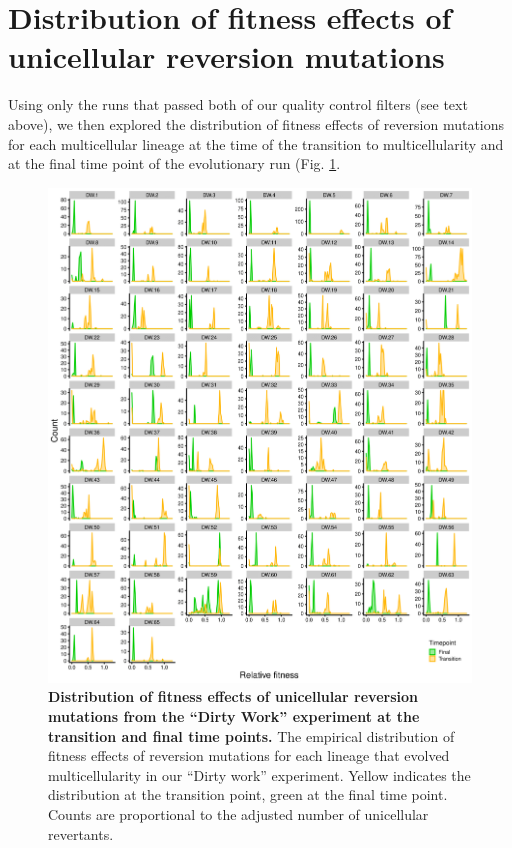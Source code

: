 \documentclass[
]{book}
\begin{document}
\hypertarget{distribution-of-fitness-effects-of-unicellular-reversion-mutations}{%
\section{Distribution of fitness effects of unicellular reversion mutations}\label{distribution-of-fitness-effects-of-unicellular-reversion-mutations}}

Using only the runs that passed both of our quality control filters (see text above), we then explored the distribution of fitness effects of reversion mutations for each multicellular lineage at the time of the transition to multicellularity and at the final time point of the evolutionary run (Fig. \ref{fig:dw-DFERMs}.

\begin{figure}
\centering
\includegraphics{images/Figure_S6_Relative_fitness_distributions_20DEC22.png}
\caption{\label{fig:dw-DFERMs}\textbf{Distribution of fitness effects of unicellular reversion mutations from the ``Dirty Work'' experiment at the transition and final time points.} The empirical distribution of fitness effects of reversion mutations for each lineage that evolved multicellularity in our ``Dirty work'' experiment. Yellow indicates the distribution at the transition point, green at the final time point. Counts are proportional to the adjusted number of unicellular revertants.}
\end{figure}
\end{document}
